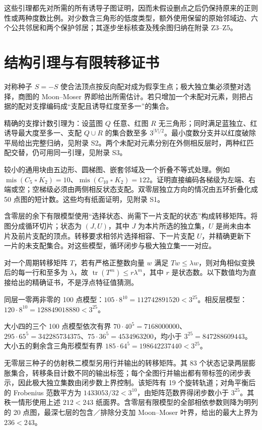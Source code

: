 \documentclass[11pt]{ctexart}
\begin{document}
这些引理都先对所需的所有诱导子图证明，因而未假设删点之后仍保持原来的正则性或两种度数比例。对少数含三角形的低度类型，额外使用保留的原始邻域边、六个公共邻居和两个保护邻居；其逐步坐标核查及残余图归纳在附录 Z3--Z5。

\section{结构引理与有限转移证书}

对称种子 \(S=-S\) 使合法顶点按反向配对成为假孪生点；极大独立集必须整对选择，商图的 Moon--Moser 界即给出所需估计。若只增加一个未配对元素，则把占据的配对支撑编码成“支配且诱导红度至多一”的集合。

精确的支撑计数引理为：设蓝图 \(Q\) 任意、红图 \(R\) 无三角形；同时满足蓝独立、红诱导最大度至多一、支配 \(Q\cup R\) 的集合数至多 \(3^{|V|/2}\)。最小度数分支并以红度破除平局给出完整归纳，见附录 S2。两个未配对元素分别在外侧相反层时，两种红匹配交替，仍可用同一引理，见附录 S3。

较小的通用块由五边形、圆梯图、嵌套邻域及一个折叠不等式处理。例如 \(\operatorname{mis}(C_5\mathbin{\square}K_2)=10\)、\(\operatorname{mis}(C_{10}\mathbin{\square}K_2)=122\)。证明直接编码各梯级为左端、右端或空；空梯级必须由两侧相反状态支配。双零层独立方向的情况由五环折叠化成 50 点图的短计数。这些均有纸面证明，见附录 S1。

含零层的余下有限模型使用“选择状态、尚需下一片支配的状态”构成转移矩阵。将图分成循环切片；状态为 \((J,U)\)，其中 \(J\) 为本片所选的独立集，\(U\) 是尚未由本片及前片支配的顶点。转移要求相邻片选择相容、下一片支配 \(U\)，并精确更新下一片的未支配集合。对这些模型，循环闭步与极大独立集一一对应。

对一个周期转移矩阵 \(T\)，若有严格正整数向量 \(w\) 满足 \(Tw\le\lambda w\)，则对角相似变换后的每一行和至多为 \(\lambda\)，故 \(\operatorname{tr}(T^m)\le r\lambda^m\)，其中 \(r\) 是状态数。以下数值均为直接给出的精确证书，不是浮点特征值猜测。

同层一零两非零的 100 点模型：\(105\cdot8^{10}=112742891520<3^{25}\)。相反层模型：\(120\cdot8^{10}=128849018880<3^{25}\)。

大小四的三个 100 点模型依次有界 \(70\cdot40^5=7168000000\)、\(295\cdot65^5=342285734375\)、\(75\cdot36^5=4534963200\)，均小于 \(3^{25}=847288609443\)。大小五的剩余含三角形模型有界 \(185\cdot64^5=198642237440<3^{25}\)。

无零层三种子的仿射秩二模型另用行并输出的转移矩阵。其 83 个状态记录两层膨胀集合，转移条目计数不同的输出标签；每个全图行并输出都有带标签的闭步表示，因此极大独立集数由闭步数上界控制。该矩阵有 19 个旋转轨道；对角平衡后的 Frobenius 范数平方为 \(1433053/32<3^{10}\)，由矩阵范数界得闭步数小于 \(3^{25}\)。其秩一情形使用上述 \(212<243\) 纸面界。含零层有限模型的全部相依参数则降为明列的 20 点图，最深七层的包含／排除分支加 Moon--Moser 叶界，给出的最大上界为 \(236<243\)。
\end{document}
